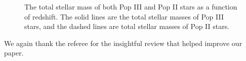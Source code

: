 \documentclass[11pt]{article}
\begin{document}
\begin{figure}[h]
    \centering
    \qquad
    \caption{The total stellar mass of both Pop III and Pop II stars as a function of redshift. The solid lines are the total stellar masses of Pop III stars, and the dashed lines are total stellar masses of Pop II stars.}%
    \label{fig:ratio}%
\end{figure}

We again thank the referee for the insightful review that helped
improve our paper.



\end{document}
